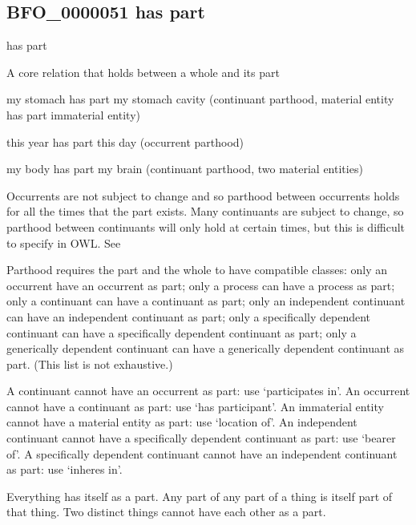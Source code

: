 \documentclass[letterpaper,10pt,english]{sphinxmanual}
\begin{document}
\subsection{BFO\_0000051 \sphinxhyphen{} has part}
\label{\detokenize{doc-BFO_0000051:bfo-0000051-has-part}}\label{\detokenize{doc-BFO_0000051:index-0}}\label{\detokenize{doc-BFO_0000051::doc}}
\begin{sphinxShadowBox}

\sphinxAtStartPar
has part
\end{sphinxShadowBox}

\begin{sphinxShadowBox}

\sphinxAtStartPar
A core relation that holds between a whole and its part
\end{sphinxShadowBox}

\begin{sphinxShadowBox}

\sphinxAtStartPar
my stomach has part my stomach cavity (continuant parthood, material entity has part immaterial entity)

\sphinxAtStartPar
this year has part this day (occurrent parthood)

\sphinxAtStartPar
my body has part my brain (continuant parthood, two material entities)
\end{sphinxShadowBox}

\begin{sphinxShadowBox}

\sphinxAtStartPar
Occurrents are not subject to change and so parthood between occurrents holds for all the times that the part exists. Many continuants are subject to change, so parthood between continuants will only hold at certain times, but this is difficult to specify in OWL. See 

\sphinxAtStartPar
Parthood requires the part and the whole to have compatible classes: only an occurrent have an occurrent as part; only a process can have a process as part; only a continuant can have a continuant as part; only an independent continuant can have an independent continuant as part; only a specifically dependent continuant can have a specifically dependent continuant as part; only a generically dependent continuant can have a generically dependent continuant as part. (This list is not exhaustive.)

\sphinxAtStartPar
A continuant cannot have an occurrent as part: use ‘participates in’. An occurrent cannot have a continuant as part: use ‘has participant’. An immaterial entity cannot have a material entity as part: use ‘location of’. An independent continuant cannot have a specifically dependent continuant as part: use ‘bearer of’. A specifically dependent continuant cannot have an independent continuant as part: use ‘inheres in’.

\sphinxAtStartPar
Everything has itself as a part. Any part of any part of a thing is itself part of that thing. Two distinct things cannot have each other as a part.
\end{sphinxShadowBox}
\end{document}
